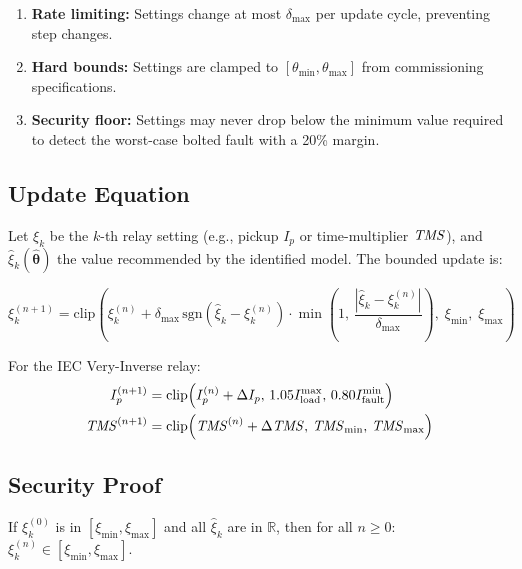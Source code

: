 \begin{enumerate}
\item \textbf{Rate limiting:} Settings change at most $\delta_\mathrm{max}$ per
      update cycle, preventing step changes.
\item \textbf{Hard bounds:} Settings are clamped to $[\theta_\mathrm{min},
      \theta_\mathrm{max}]$ from commissioning specifications.
\item \textbf{Security floor:} Settings may never drop below the minimum
      value required to detect the worst-case bolted fault with a 20\%
      margin.
\end{enumerate}

\subsection{Update Equation}

Let $\xi_k$ be the $k$-th relay setting (e.g., pickup $I_p$ or
time-multiplier $\mathit{TMS}$), and $\hat{\xi}_k(\hat{\bm{\theta}})$ the
value recommended by the identified model. The bounded update is:

\begin{equation}
  \xi_k^{(n+1)} = \mathrm{clip}\!\left(
    \xi_k^{(n)} + \delta_\mathrm{max}\,
    \mathrm{sgn}(\hat{\xi}_k - \xi_k^{(n)})
    \cdot \min\left(1,\,
      \frac{|\hat{\xi}_k - \xi_k^{(n)}|}{\delta_\mathrm{max}}
    \right),\;
    \xi_\mathrm{min},\; \xi_\mathrm{max}
  \right)
  \label{eq:ch2_update}
\end{equation}

For the IEC Very-Inverse relay:
\begin{align}
  I_p^{(n+1)} &= \mathrm{clip}\!\left(I_p^{(n)} + \Delta I_p,\,
    1.05 I_\mathrm{load}^{\max},\, 0.80 I_\mathrm{fault}^{\min}\right)
  \label{eq:ch2_ip_update} \\
  \mathit{TMS}^{(n+1)} &= \mathrm{clip}\!\left(\mathit{TMS}^{(n)} + \Delta \mathit{TMS},\,
    \mathit{TMS}_\mathrm{min},\, \mathit{TMS}_\mathrm{max}\right)
  \label{eq:ch2_tms_update}
\end{align}

\subsection{Security Proof}

\begin{proposition}
\label{prop:ch2_security}
If $\xi_k^{(0)}$ is in $[\xi_\mathrm{min}, \xi_\mathrm{max}]$ and all
$\hat{\xi}_k$ are in $\mathbb{R}$, then for all $n \geq 0$:
$\xi_k^{(n)} \in [\xi_\mathrm{min}, \xi_\mathrm{max}]$.
\end{proposition}


